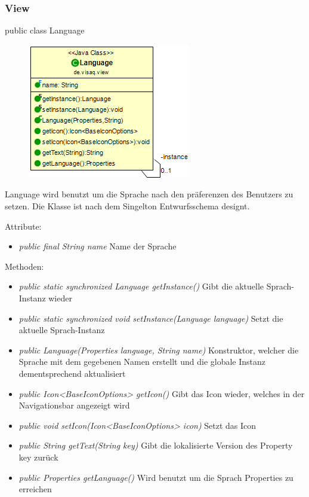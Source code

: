 \subsubsection{View}

public class Language

\begin{minipage}{0.3\textwidth}
    \begin{figure}[H]
        \includegraphics[scale = 0.5]{media/frontend/view/de.view/Language_Class.png}
    \end{figure}
\end{minipage} \hfill
\begin{minipage}{0.6\textwidth}
    Language wird benutzt um die Sprache nach den präferenzen des Benutzers zu setzen. Die Klasse ist nach dem Singelton Entwurfsschema designt.
\end{minipage}

Attribute:
\begin{itemize}
    \item \emph{public final String name} Name der Sprache
\end{itemize}
Methoden:
\begin{itemize}
    \item \emph{public static synchronized Language getInstance()} Gibt die aktuelle Sprach-Instanz wieder
    \item \emph{public static synchronized void setInstance(Language language)} Setzt die aktuelle Sprach-Instanz
    \item \emph{public Language(Properties language, String name)} Konstruktor, welcher die Sprache mit dem gegebenen Namen erstellt und die globale Instanz dementsprechend aktualisiert
    \item \emph{public Icon<BaseIconOptions> getIcon()} Gibt das Icon wieder, welches in der Navigationsbar angezeigt wird
    \item \emph{public void setIcon(Icon<BaseIconOptions> icon)} Setzt das Icon
    \item \emph{public String getText(String key)} Gibt die lokalisierte Version des Property key zurück
    \item \emph{public Properties getLanguage()} Wird benutzt um die Sprach Properties zu erreichen
\end{itemize}

